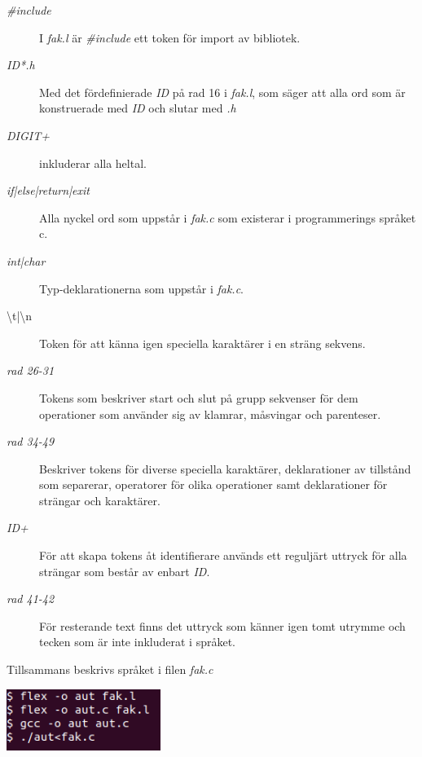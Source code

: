 \begin{description}

\item[\textit{\#include}] I \textit{fak.l} är \textit{\#include} ett token för import av bibliotek. 

\item[\textit{{ID}*.h}] Med det fördefinierade \textit{ID} på rad 16 i
\textit{fak.l}, som säger att alla ord som är konstruerade med \textit{ID} och slutar
med \textit{.h}

\item[\textit{{DIGIT}+}] inkluderar alla heltal.

\item[\textit{if|else|return|exit}] Alla nyckel ord som uppstår i \textit{fak.c }
som existerar i programmerings språket c.

\item[\textit{int|char}] Typ-deklarationerna som uppstår i \textit{fak.c}. 

\item[\textbackslash t|\textbackslash n] Token för att känna igen speciella karaktärer i en sträng sekvens.

\item[\textit{rad 26-31}] Tokens som beskriver start och slut på grupp sekvenser för dem
operationer som använder sig av klamrar, måsvingar och parenteser.

\item[\textit{rad 34-49}] Beskriver tokens för diverse speciella karaktärer, deklarationer av
tillstånd som separerar, operatorer för olika operationer samt deklarationer för strängar och
karaktärer.

\item[\textit{{ID}+}] För att skapa tokens åt identifierare används ett reguljärt uttryck för alla strängar som
består av enbart \textit{ID}.

\item[\textit{rad 41-42}] För resterande text finns det uttryck som känner igen tomt utrymme och
tecken som är inte inkluderat i språket.

\end{description}

 Tillsammans beskrivs språket i filen \textit{fak.c}


\begin{center}
    \includegraphics[height=2cm]{bilder/flex_command.png}
    \label{fig:flex}
\end{center}

